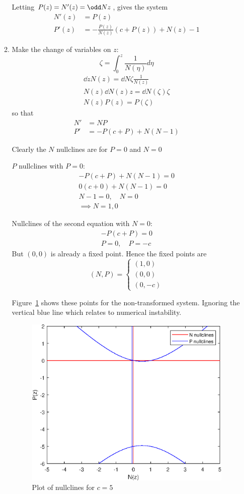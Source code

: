 \documentclass{X:/Documents/Coding/Latex/myassignment}
\begin{document}
\begin{enumerate}
\begin{enumerate}
		Letting $P(z) = N'(z) = \odd Nz$, gives the system
		\begin{align*}
			N'(z) &= P(z)\\
			P'(z) &= - \frac{P(z)}{N(z)} \left(c + P(z)\right) + N(z) - 1
		\end{align*}

		\item Make the change of variables on $z$:
		\[\zeta = \int_0^z \frac{1}{N(\eta)} d \eta\]
		\begin{align*}
			\dd{}z N(z) = \dd{N}\zeta \frac{1}{N(z)}\\
			N(z) \dd{N(z)}z  = \dd{N(\zeta)}\zeta\\
			N(z) P(z) = P(\zeta)
		\end{align*}
		so that 
		\begin{align*}
			N' &= NP\\
			P' &= - P\left(c + P\right) + N(N - 1)
		\end{align*}

		Clearly the $N$ nullclines are for $P = 0$ and $N=0$
		
		$P$ nullclines with $P = 0$:
		\begin{align*}
			  - P\left(c + P\right) + N(N - 1) = 0\\
			 0\left(c + 0\right) +N(N - 1) = 0\\
			 N - 1 = 0, \quad N = 0\\
			 \implies N = 1, 0 
		\end{align*}

		Nullclines of the second equation with $N = 0$:
		\begin{align*}
			- P\left(c + P\right)= 0\\
			P = 0, \quad P = -c
		\end{align*}
		But $(0,0)$ is already a fixed point. Hence the fixed points are
		\[(N,P) = \begin{cases}
			(1,0)\\
			(0,0)\\
			(0,-c)			
		\end{cases}\]

		Figure~\ref{fig:Q5} shows these points for the non-transformed system. Ignoring the vertical blue line which relates to numerical instability.
		\begin{figure}[tb]
			\centering
			\includegraphics[width =0.6\linewidth]{A2Q5.eps}
			\caption{Plot of nullclines for $c = 5$}
			\label{fig:Q5}
		\end{figure}


\end{enumerate}
\end{enumerate}
\end{document}
